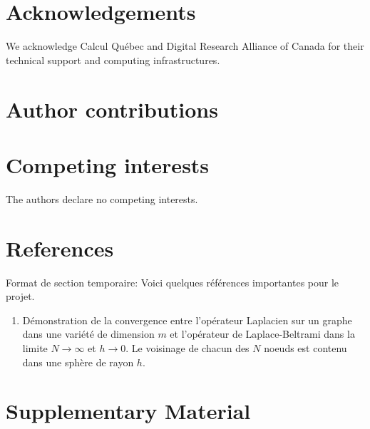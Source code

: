 \documentclass{article}
\begin{document}
\begin{multicols}{2}
\newpage

%
%

\section*{Acknowledgements}

We acknowledge Calcul Québec and Digital Research Alliance of Canada for their technical support and computing infrastructures.

\section*{Author contributions}

\section*{Competing interests}

The authors declare no competing interests.

\end{multicols}

\newpage

\section*{References}

Format de section temporaire: Voici quelques références importantes pour le projet.

\begin{enumerate}
    \item {}
    \subitem Démonstration de la convergence entre l'opérateur Laplacien sur un graphe dans une variété de dimension $m$ et l'opérateur de Laplace-Beltrami dans la limite $N\to\infty$ et $h\to0$. Le voisinage de chacun des $N$ noeuds est contenu dans une sphère de rayon $h$.
\end{enumerate}



\newpage

\section*{Supplementary Material}
\end{document}
